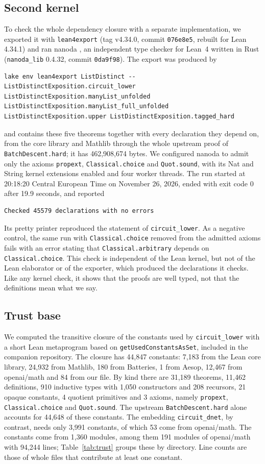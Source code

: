 \documentclass[11pt]{amsart}
\theoremstyle{definition}
\theoremstyle{remark}
\newcommand{\lean}[1]{\texttt{#1}}
\begin{document}
\subsection{Second kernel}\label{sec:nanoda}
To check the whole dependency closure with a separate implementation, we exported it with \lean{lean4export} \cite{lean4export} (tag v4.34.0, commit \lean{076e8e5}, rebuilt for Lean 4.34.1) and ran nanoda \cite{nanoda}, an independent type checker for Lean~4 written in Rust (\lean{nanoda\_lib} 0.4.32, commit \lean{0da9f98}). The export was produced by
\begin{lstlisting}[language={}]
lake env lean4export ListDistinct -- ListDistinctExposition.circuit_lower ListDistinctExposition.manyList_unfolded ListDistinctExposition.manyList_full_unfolded ListDistinctExposition.upper ListDistinctExposition.tagged_hard
\end{lstlisting}
and contains these five theorems together with every declaration they depend on, from the core library and Mathlib through the whole upstream proof of \lean{BatchDescent.hard}; it has 462,908,674 bytes. We configured nanoda to admit only the axioms \lean{propext}, \lean{Classical.choice} and \lean{Quot.sound}, with its Nat and String kernel extensions enabled and four worker threads. The run started at 20:18:20 Central European Time on November 26, 2026, ended with exit code 0 after 19.9 seconds, and reported
\begin{lstlisting}
Checked 45579 declarations with no errors
\end{lstlisting}
Its pretty printer reproduced the statement of \lean{circuit\_lower}. As a negative control, the same run with \lean{Classical.choice} removed from the admitted axioms fails with an error stating that \lean{Classical.arbitrary} depends on \lean{Classical.choice}. This check is independent of the Lean kernel, but not of the Lean elaborator or of the exporter, which produced the declarations it checks. Like any kernel check, it shows that the proofs are well typed, not that the definitions mean what we say.

\subsection{Trust base}\label{sec:trust}
We computed the transitive closure of the constants used by \lean{circuit\_lower} with a short Lean metaprogram based on \lean{getUsedConstantsAsSet}, included in the companion repository. The closure has 44,847 constants: 7,183 from the Lean core library, 24,932 from Mathlib, 180 from Batteries, 1 from Aesop, 12,467 from openai/math and 84 from our file. By kind there are 31,189 theorems, 11,462 definitions, 910 inductive types with 1,050 constructors and 208 recursors, 21 opaque constants, 4 quotient primitives and 3 axioms, namely \lean{propext}, \lean{Classical.choice} and \lean{Quot.sound}. The upstream \lean{BatchDescent.hard} alone accounts for 44,648 of these constants. The embedding \lean{circuit\_dnet}, by contrast, needs only 3,991 constants, of which 53 come from openai/math. The constants come from 1,360 modules, among them 191 modules of openai/math with 94,244 lines; Table~\ref{tab:trust} groups these by directory. Line counts are those of whole files that contribute at least one constant.
\end{document}
